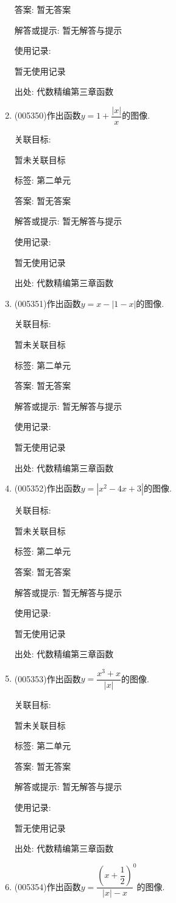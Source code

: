 \documentclass[10pt,a4paper]{article}
\begin{document}
\begin{enumerate}[1.]
答案: 暂无答案

解答或提示: 暂无解答与提示

使用记录:

暂无使用记录


出处: 代数精编第三章函数
\item { (005350)}作出函数$y=1+\dfrac{|x|}x$的图像.


关联目标:

暂未关联目标



标签: 第二单元

答案: 暂无答案

解答或提示: 暂无解答与提示

使用记录:

暂无使用记录


出处: 代数精编第三章函数
\item { (005351)}作出函数$y=x-|1-x|$的图像.


关联目标:

暂未关联目标



标签: 第二单元

答案: 暂无答案

解答或提示: 暂无解答与提示

使用记录:

暂无使用记录


出处: 代数精编第三章函数
\item { (005352)}作出函数$y=|x^2-4x+3|$的图像.


关联目标:

暂未关联目标



标签: 第二单元

答案: 暂无答案

解答或提示: 暂无解答与提示

使用记录:

暂无使用记录


出处: 代数精编第三章函数
\item { (005353)}作出函数$y=\dfrac{x^3+x}{|x|}$的图像.


关联目标:

暂未关联目标



标签: 第二单元

答案: 暂无答案

解答或提示: 暂无解答与提示

使用记录:

暂无使用记录


出处: 代数精编第三章函数
\item { (005354)}作出函数$y=\dfrac{(x+\dfrac 12)}{|x|-x}^0$的图像.



\end{enumerate}
\end{document}
